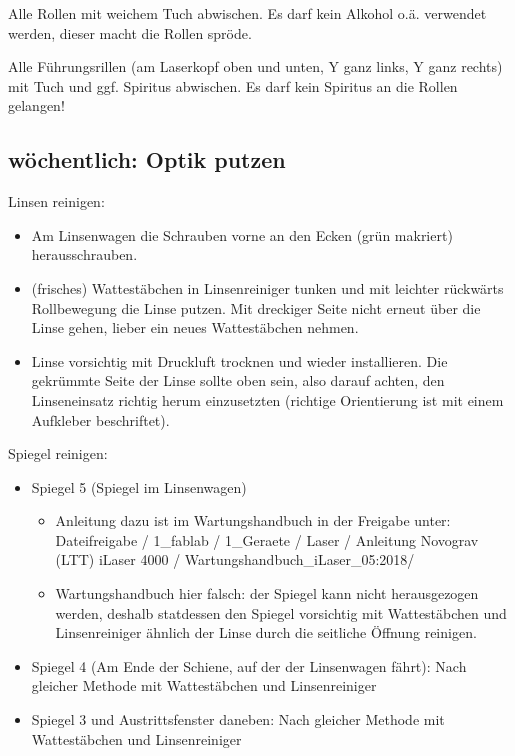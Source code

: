 \documentclass{\basedir/fablab-document}
\begin{document}
	Alle Rollen mit weichem Tuch abwischen. Es darf kein Alkohol o.ä. verwendet werden, dieser macht die Rollen spröde.
	
	Alle Führungsrillen (am Laserkopf oben und unten, Y ganz links, Y ganz rechts) mit Tuch und ggf. Spiritus abwischen. Es darf kein Spiritus an die Rollen gelangen!
	
	\subsection{wöchentlich: Optik putzen}
	
	Linsen reinigen:
	\begin{itemize}
		\item Am Linsenwagen die Schrauben vorne an den Ecken (grün makriert) herausschrauben.
		\item (frisches) Wattestäbchen in Linsenreiniger tunken und mit leichter rückwärts Rollbewegung die Linse putzen. Mit dreckiger Seite nicht erneut über die Linse gehen, lieber ein neues Wattestäbchen nehmen.
		\item Linse vorsichtig mit Druckluft trocknen und wieder installieren. Die gekrümmte Seite der Linse sollte oben sein, also darauf achten, den Linseneinsatz richtig herum einzusetzten (richtige Orientierung ist mit einem Aufkleber beschriftet).
	\end{itemize}

	Spiegel reinigen:
	\begin{itemize}
		\item Spiegel 5 (Spiegel im Linsenwagen)
		\begin{itemize}
			\item 	Anleitung dazu ist im Wartungshandbuch in der Freigabe unter: Dateifreigabe / 1\_fablab / 1\_Geraete / Laser / Anleitung Novograv (LTT) iLaser 4000 / Wartungshandbuch\_iLaser\_05:2018/
			\item 	Wartungshandbuch hier falsch: der Spiegel kann nicht herausgezogen werden, deshalb statdessen den Spiegel vorsichtig mit Wattestäbchen und Linsenreiniger ähnlich der Linse durch die seitliche Öffnung reinigen.
		\end{itemize}
		\item Spiegel 4 (Am Ende der Schiene, auf der der Linsenwagen fährt): Nach gleicher Methode mit Wattestäbchen und Linsenreiniger
		\item Spiegel 3 und Austrittsfenster daneben: Nach gleicher Methode mit Wattestäbchen und Linsenreiniger
	\end{itemize}
\end{document}
